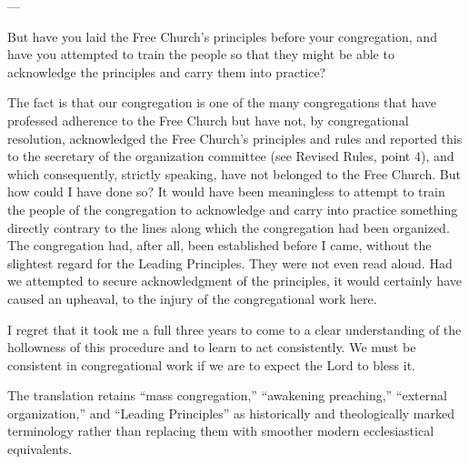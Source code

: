 ---

But have you laid the Free Church’s principles before your congregation, and have you attempted to train the people so that they might be able to acknowledge the principles and carry them into practice?

The fact is that our congregation is one of the many congregations that have professed adherence to the Free Church but have not, by congregational resolution, acknowledged the Free Church’s principles and rules and reported this to the secretary of the organization committee (see Revised Rules, point 4), and which consequently, strictly speaking, have not belonged to the Free Church. But how could I have done so? It would have been meaningless to attempt to train the people of the congregation to acknowledge and carry into practice something directly contrary to the lines along which the congregation had been organized. The congregation had, after all, been established before I came, without the slightest regard for the Leading Principles. They were not even read aloud. Had we attempted to secure acknowledgment of the principles, it would certainly have caused an upheaval, to the injury of the congregational work here.

I regret that it took me a full three years to come to a clear understanding of the hollowness of this procedure and to learn to act consistently. We must be consistent in congregational work if we are to expect the Lord to bless it.

The translation retains “mass congregation,” “awakening preaching,” “external organization,” and “Leading Principles” as historically and theologically marked terminology rather than replacing them with smoother modern ecclesiastical equivalents.
